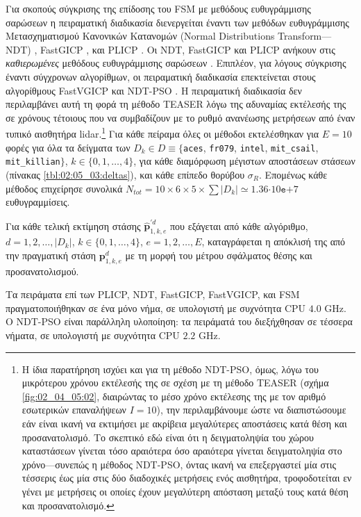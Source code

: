 Για σκοπούς σύγκρισης της επίδοσης του FSM με μεθόδους ευθυγράμμισης σαρώσεων η
πειραματική διαδικασία διενεργείται έναντι των μεθόδων ευθυγράμμισης
Μετασχηματισμού Κανονικών Κατανομών (Normal Distributions Transform---NDT)
\cite{Bibera,ndt_code}, FastGICP \cite{Segal2009a,fgicp_code}, και PLICP
\cite{Censi2008a,plicp_code}. Οι NDT, FastGICP και PLICP ανήκουν στις
\textit{καθιερωμένες} μεθόδους ευθυγράμμισης σαρώσεων
\cite{Koide2021a,Xu2018b,Sobreira2019b,Pishehvari2019b,Qingshan2019c,Pham2021b}.
Επιπλέον, για λόγους σύγκρισης έναντι σύγχρονων αλγορίθμων, οι πειραματική
διαδικασία επεκτείνεται στους αλγορίθμους FastVGICP
\cite{Koide2021a,fgicp_code} και NDT-PSO \cite{Bouraine2021,ndt_pso_code}. Η
πειραματική διαδικασία δεν περιλαμβάνει αυτή τη φορά τη μέθοδο TEASER λόγω της
αδυναμίας εκτέλεσής της σε χρόνους τέτοιους που να συμβαδίζουν με το ρυθμό
ανανέωσης μετρήσεων από έναν τυπικό αισθητήρα lidar.\footnote{Η ίδια παρατήρηση
ισχύει και για τη μέθοδο NDT-PSO, όμως, λόγω του μικρότερου χρόνου εκτέλεσής
της σε σχέση με τη μέθοδο TEASER (σχήμα \ref{fig:02_04_05:02},
διαιρώντας το μέσο χρόνο εκτέλεσης της με τον αριθμό εσωτερικών επαναλήψεων
$I=10$), την περιλαμβάνουμε ώστε να διαπιστώσουμε εάν είναι ικανή να εκτιμήσει
με ακρίβεια μεγαλύτερες αποστάσεις κατά θέση και προσανατολισμό. Το σκεπτικό
εδώ είναι ότι η δειγματοληψία του χώρου καταστάσεων γίνεται τόσο αραιότερα όσο
αραιότερα γίνεται δειγματοληψία στο χρόνο---συνεπώς η μέθοδος NDT-PSO, όντας
ικανή να επεξεργαστεί μία στις τέσσερις έως μία στις δύο διαδοχικές μετρήσεις
ενός αισθητήρα, τροφοδοτείται εν γένει με μετρήσεις οι οποίες έχουν μεγαλύτερη
απόσταση μεταξύ τους κατά θέση και προσανατολισμό.} Για κάθε πείραμα όλες οι
μέθοδοι εκτελέσθηκαν για $E = 10$ φορές για όλα τα δείγματα των $D_k \in D
\equiv \{$\texttt{aces}, \texttt{fr079}, \texttt{intel}, \texttt{mit\_csail},
\texttt{mit\_killian}$\}$, $k \in \{0,1,\dots,4\}$, για κάθε διαμόρφωση
μέγιστων αποστάσεων στάσεων (πίνακας \ref{tbl:02:05_03:deltas}), και κάθε
επίπεδο θορύβου $\sigma_R$.  Επομένως κάθε μέθοδος επιχείρησε συνολικά $N_{tot}
= 10 \times 6 \times 5 \times \sum |D_k|\simeq 1.36$$\cdot10$$\texttt{e}$$+$$7$
ευθυγραμμίσεις.

Για κάθε τελική εκτίμηση στάσης $\hat{\bm{p}}_{1,k,e}^{\prime d}$ που εξάγεται
από κάθε αλγόριθμο, $d = 1,2,\dots,|D_k|$, $k \in \{0,1,\dots,4\}$,
$e=1,2,\dots,E$, καταγράφεται η απόκλισή της από την πραγματική στάση
$\bm{p}_{1,k,e}^d$ με τη μορφή του μέτρου σφάλματος θέσης και προσανατολισμού.

Τα πειράματα επί των  PLICP, NDT, FastGICP, FastVGICP, και FSM
πραγματοποιήθηκαν σε ένα μόνο νήμα, σε υπολογιστή με συχνότητα CPU $4.0$ GHz. Ο
NDT-PSO είναι παράλληλη υλοποίηση: τα πειράματά του διεξήχθησαν σε τέσσερα
νήματα, σε υπολογιστή με συχνότητα CPU $2.2$ GHz.




